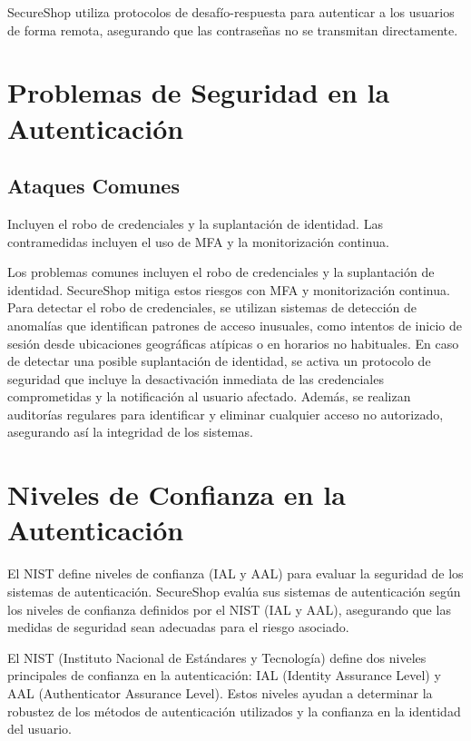 SecureShop utiliza protocolos de desafío-respuesta para autenticar a los usuarios de forma remota, asegurando que las contraseñas no se transmitan directamente.

\section{Problemas de Seguridad en la Autenticación}
\subsection{Ataques Comunes}
Incluyen el robo de credenciales y la suplantación de identidad. Las contramedidas incluyen el uso de MFA y la monitorización continua.


Los problemas comunes incluyen el robo de credenciales y la suplantación de identidad. SecureShop mitiga estos riesgos con MFA y monitorización continua. Para detectar el robo de credenciales, se utilizan sistemas de detección de anomalías que identifican patrones de acceso inusuales, como intentos de inicio de sesión desde ubicaciones geográficas atípicas o en horarios no habituales. En caso de detectar una posible suplantación de identidad, se activa un protocolo de seguridad que incluye la desactivación inmediata de las credenciales comprometidas y la notificación al usuario afectado. Además, se realizan auditorías regulares para identificar y eliminar cualquier acceso no autorizado, asegurando así la integridad de los sistemas.

\section{Niveles de Confianza en la Autenticación}
El NIST define niveles de confianza (IAL y AAL) para evaluar la seguridad de los sistemas de autenticación.
SecureShop evalúa sus sistemas de autenticación según los niveles de confianza definidos por el NIST (IAL y AAL), asegurando que las medidas de seguridad sean adecuadas para el riesgo asociado. 

El NIST (Instituto Nacional de Estándares y Tecnología) define dos niveles principales de confianza en la autenticación: IAL (Identity Assurance Level) y AAL (Authenticator Assurance Level). Estos niveles ayudan a determinar la robustez de los métodos de autenticación utilizados y la confianza en la identidad del usuario.

